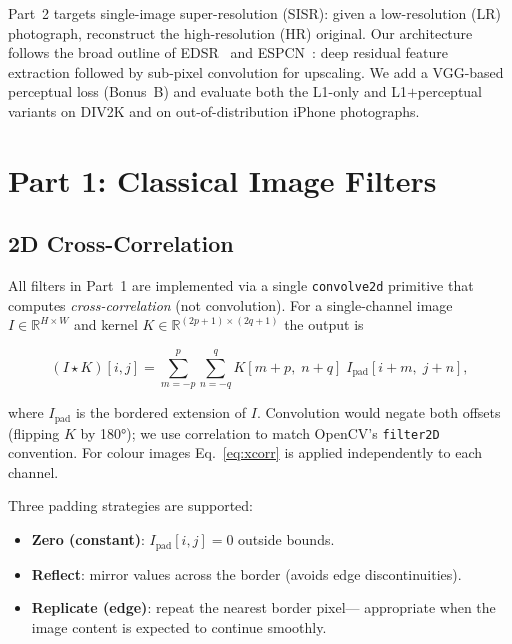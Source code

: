 \documentclass{article}
\begin{document}
Part~2 targets single-image super-resolution (SISR): given a low-resolution
(LR) photograph, reconstruct the high-resolution (HR) original.
Our architecture follows the broad outline of EDSR~\cite{lim2017enhanced} and
ESPCN~\cite{shi2016real}: deep residual feature extraction followed by
sub-pixel convolution for upscaling.
We add a VGG-based perceptual loss (Bonus~B) and evaluate both the L1-only and
L1$+$perceptual variants on DIV2K and on out-of-distribution iPhone photographs.

\section{Part 1: Classical Image Filters}

\subsection{2D Cross-Correlation}

All filters in Part~1 are implemented via a single \texttt{convolve2d}
primitive that computes \emph{cross-correlation} (not convolution).
For a single-channel image $I \in \mathbb{R}^{H \times W}$ and kernel
$K \in \mathbb{R}^{(2p+1)\times(2q+1)}$ the output is

\begin{equation}
  (I \star K)[i,j]
  = \sum_{m=-p}^{p} \sum_{n=-q}^{q}
    K[m+p,\; n+q]\; I_{\text{pad}}[i+m,\; j+n],
  \label{eq:xcorr}
\end{equation}

where $I_{\text{pad}}$ is the bordered extension of $I$.
Convolution would negate both offsets (flipping $K$ by 180°); we use
correlation to match OpenCV's \texttt{filter2D} convention.
For colour images Eq.~\eqref{eq:xcorr} is applied independently to each
channel.

Three padding strategies are supported:
\begin{itemize}
  \item \textbf{Zero (constant)}: $I_{\text{pad}}[i,j] = 0$ outside bounds.
  \item \textbf{Reflect}: mirror values across the border (avoids edge
        discontinuities).
  \item \textbf{Replicate (edge)}: repeat the nearest border pixel---
        appropriate when the image content is expected to continue smoothly.
\end{itemize}
\end{document}
